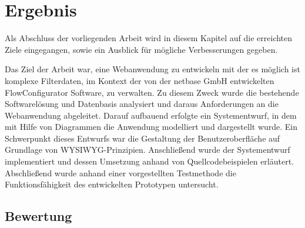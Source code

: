\chapter{Ergebnis}
\label{cha:Ergebnis}
Als Abschluss der vorliegenden Arbeit wird in diesem Kapitel auf die erreichten Ziele eingegangen, sowie ein Ausblick für mögliche Verbesserungen gegeben.

Das Ziel der Arbeit war, eine Webanwendung zu entwickeln mit der es möglich ist komplexe Filterdaten, im Kontext der von der netbase GmbH entwickelten FlowConfigurator Software, zu verwalten. Zu diesem Zweck wurde die bestehende Softwarelösung und Datenbasis analysiert und daraus Anforderungen an die Webanwendung abgeleitet. Darauf aufbauend erfolgte ein Systementwurf, in dem mit Hilfe von Diagrammen die Anwendung modelliert und dargestellt wurde. Ein Schwerpunkt dieses Entwurfs war die Gestaltung der Benutzeroberfläche auf Grundlage von WYSIWYG-Prinzipien. Anschließend wurde der Systementwurf implementiert und dessen Umsetzung anhand von Quellcodebeispielen erläutert. Abschließend wurde anhand einer vorgestellten Testmethode die Funktionsfähigkeit des entwickelten Prototypen untersucht.

\section{Bewertung}

